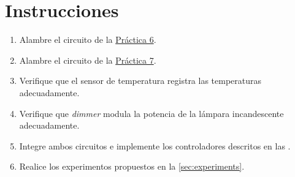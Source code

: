 %
%


\section{Instrucciones}%
\label{sec:instructions}
\begin{enumerate}[noitemsep]
	\item Alambre el circuito de la \href{https://github.com/kyordhel/FSEm/tree/master/practica06}{Práctica 6}.
	\item Alambre el circuito de la \href{https://github.com/kyordhel/FSEm/tree/master/practica07}{Práctica 7}.
	\item Verifique que el sensor de temperatura registra las temperaturas adecuadamente.
	\item Verifique que \emph{dimmer} modula la potencia de la lámpara incandescente adecuadamente.
	\item Integre ambos circuitos e implemente los controladores descritos en las .
 	\item Realice los experimentos propuestos en la \cref{sec:experiments}.
\end{enumerate}



% 




